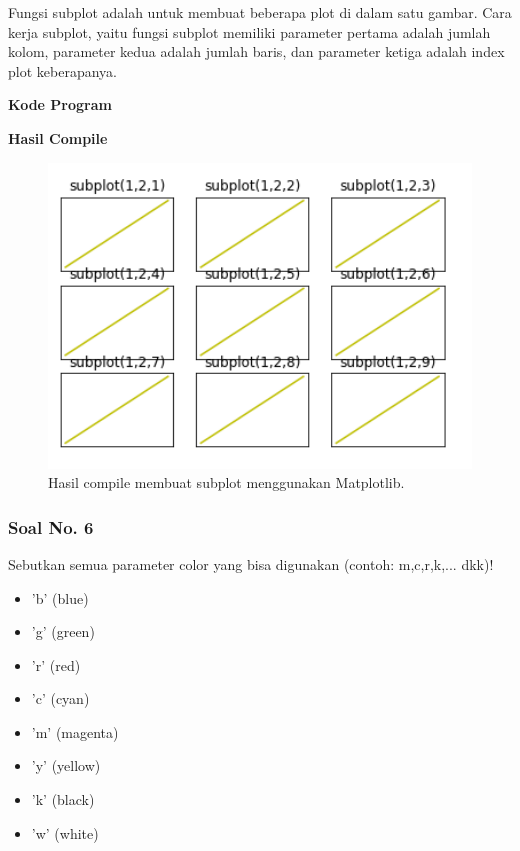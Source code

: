 \hfill \break
Fungsi subplot adalah untuk membuat beberapa plot di dalam satu gambar.
\hfill \break
Cara kerja subplot, yaitu fungsi subplot memiliki parameter pertama adalah jumlah kolom, parameter kedua adalah jumlah baris, dan parameter ketiga adalah index plot keberapanya.

\hfill \break
\textbf{Kode Program}



\hfill \break
\textbf{Hasil Compile}

\begin{figure}[H]
	\includegraphics[width=12cm]{figures/6/1174042/9.png}
	\centering
	\caption{Hasil compile membuat subplot menggunakan Matplotlib.}
\end{figure}

\subsubsection{Soal No. 6}
\hfill \break
Sebutkan semua parameter color yang bisa digunakan (contoh:  m,c,r,k,...  dkk)!

\begin{itemize}
	\item 'b' (blue)
	\item 'g' (green)
	\item 'r' (red)
	\item 'c' (cyan)
	\item 'm' (magenta)
	\item 'y' (yellow)
	\item 'k' (black)
	\item 'w' (white)
\end{itemize}

